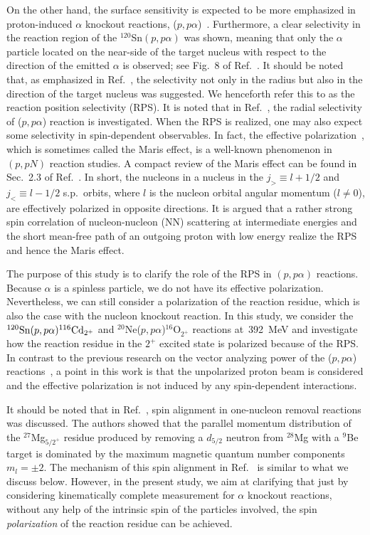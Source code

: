 \documentclass[%
 reprint,
superscriptaddress,
 amsmath,amssymb,
 aps,
]{revtex4-2}
\begin{document}
On the other hand, the surface sensitivity is expected to be more emphasized in proton-induced
$\alpha$ knockout reactions, ($p,p\alpha$)~\cite{Yoshida16,Yoshida18}. 
Furthermore, a clear selectivity in 
the reaction region of the $^{120}$Sn$(p,p\alpha)$ was shown, meaning that only the $\alpha$ particle located on the near-side of the target nucleus with respect to the direction of the emitted $\alpha$ is observed; 
see Fig.~8 of Ref.~\cite{Yoshida16}.
It should be noted that, as emphasized in Ref.~\cite{Yoshida16}, the selectivity not only in the radius but also in the direction of the target nucleus was suggested.
We henceforth refer this to as the reaction position selectivity (RPS).
It is noted that in Ref.~\cite{Yoshida18}, the radial selectivity of ($p,p\alpha$) reaction is investigated.
When the RPS is realized, one may also expect some selectivity in spin-dependent observables. 
In fact, the effective polarization~\cite{Maris58,Jacob76,Maris79,Krein95}, 
which is sometimes called the Maris effect, 
is a well-known phenomenon in $(p,pN)$ reaction studies. 
A compact review of the Maris effect can be found in Sec.~2.3 of Ref.~\cite{Wakasa17}. 
In short, the nucleons in a nucleus in the $j_> \equiv l+1/2$ and $j_< \equiv l-1/2$ s.p.~orbits, 
where $l$ is the nucleon orbital angular momentum ($l \neq 0$), 
are effectively polarized in opposite directions. 
It is argued that a rather strong spin correlation of nucleon-nucleon (NN) scattering 
at intermediate energies and the short mean-free path of an outgoing proton 
with low energy realize the RPS and hence the Maris effect.

The purpose of this study is to clarify the role of the RPS in $(p,p\alpha)$ reactions. 
Because $\alpha$ is a spinless particle, we do not have its effective polarization. 
Nevertheless, we can still consider a polarization of the reaction residue, which is also the case with the nucleon knockout reaction. 
In this study, we consider the $^{120}{\rm Sn}(p,p\alpha){}^{116}{\rm Cd}_{2^+}$ and $^{20}$Ne($p,p\alpha$)$^{16}\mathrm{O}_{2^+}$ reactions at~392~MeV 
and investigate how the reaction residue in the $2^+$ excited state is polarized because of the RPS. 
In contrast to the previous research on the vector analyzing power of the 
($p,p\alpha$) reactions~\cite{Wang85,Neveling08,Cowley09,Mabiala09,Cowley21},
a point in this work is that the unpolarized proton beam is considered and
the effective polarization is not induced by any spin-dependent interactions.

It should be noted that in Ref.~\cite{Hansen03}, spin alignment
in one-nucleon removal reactions was discussed. The authors showed
that the parallel momentum distribution of the $^{27}$Mg$_{5/2^+}$ 
residue produced by removing a $d_{5/2}$ neutron from $^{28}$Mg
with a $^{9}$Be target is dominated by the maximum magnetic quantum
number components $m_l = \pm 2$.
The mechanism of this spin alignment in Ref.~\cite{Hansen03} is
similar to what we discuss below.
However, in the present study, we aim at clarifying that just by considering
kinematically complete measurement for $\alpha$ knockout reactions, 
without any help of the intrinsic spin of the particles involved, 
the spin {\it polarization} of the reaction residue can be achieved.
\end{document}
